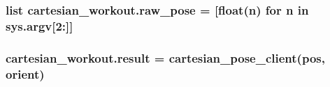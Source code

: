 \subsubsection[{\texorpdfstring{raw\+\_\+pose}{raw_pose}}]{\setlength{\rightskip}{0pt plus 5cm}list cartesian\+\_\+workout.\+raw\+\_\+pose = \mbox{[}float(n) for n in sys.\+argv\mbox{[}2\+:\mbox{]}\mbox{]}}\hypertarget{namespacecartesian__workout_a967ea83284096aa4c94c0b41daa5df6c}{}\label{namespacecartesian__workout_a967ea83284096aa4c94c0b41daa5df6c}
\subsubsection[{\texorpdfstring{result}{result}}]{\setlength{\rightskip}{0pt plus 5cm}cartesian\+\_\+workout.\+result = {\bf cartesian\+\_\+pose\+\_\+client}(pos, orient)}\hypertarget{namespacecartesian__workout_ac2ac6ec3a92f53155c4912cbf5c93604}{}\label{namespacecartesian__workout_ac2ac6ec3a92f53155c4912cbf5c93604}
